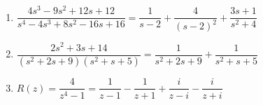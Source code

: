 \documentclass{ximera}
\begin{document}
\begin{enumerate}
\item $\dfrac{4s^{3} - 9s^{2} + 12s + 12}{s^{4} - 4s^{3} + 8s^{2} - 16s + 16}= \dfrac{1}{s - 2} + \dfrac{4}{(s - 2)^{2}} + \dfrac{3s + 1}{s^{2} + 4}$
\item $\dfrac{2s^{2} + 3s + 14}{(s^{2} + 2s + 9)(s^{2} + s + 5)} = \dfrac{1}{s^{2} + 2s + 9} + \dfrac{1}{s^{2} + s + 5}$

\item $R(z) = \dfrac{4}{z^4-1} = \dfrac{1}{z-1} - \dfrac{1}{z+1} + \dfrac{i}{z-i} -  \dfrac{i}{z+i} $

\end{enumerate}
\end{document}
